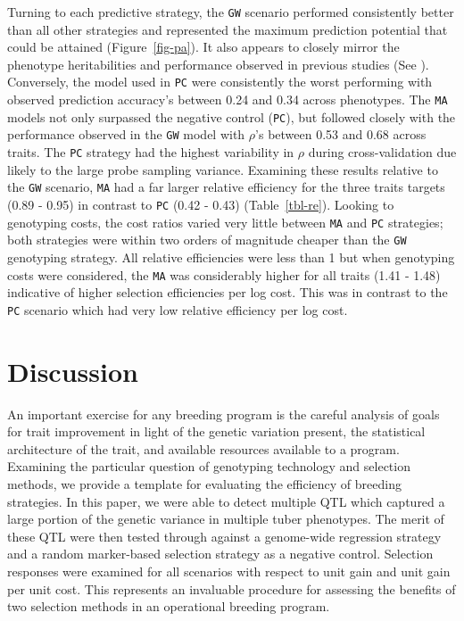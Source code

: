 Turning to each predictive strategy, the \texttt{GW} scenario performed
consistently better than all other strategies and represented the maximum
prediction potential that could be attained (Figure~\ref{fig-pa}). It
also appears to closely mirror the phenotype heritabilities and
performance observed in previous studies (See \textcite{Adams2023}).
Conversely, the model used in \texttt{PC} were consistently the worst
performing with observed prediction accuracy's between 0.24 and 0.34 across
phenotypes. The \texttt{MA} models not only surpassed the negative
control (\texttt{PC}), but followed closely with the performance
observed in the \texttt{GW} model with \(\rho\)'s between 0.53 and 0.68
across traits. The \texttt{PC} strategy had the highest variability in
\(\rho\) during cross-validation due likely to the large probe sampling
variance. Examining these results relative to the \texttt{GW} scenario,
\texttt{MA} had a far larger relative efficiency for the three traits
targets (0.89 - 0.95) in contrast to \texttt{PC} (0.42 - 0.43)
(Table~\ref{tbl-re}). Looking to genotyping costs, the cost ratios varied very little between \texttt{MA} and \texttt{PC} strategies; both strategies were within two orders of magnitude cheaper than the \texttt{GW} genotyping strategy. All relative efficiencies were less than 1 but
when genotyping costs were considered, the \texttt{MA} was considerably
higher for all traits (1.41 - 1.48) indicative of higher selection
efficiencies per log cost. This was in contrast to the \texttt{PC}
scenario which had very low relative efficiency per log cost.
\section{Discussion}

An important exercise for any breeding program is the careful analysis
of goals for trait improvement in light of the genetic variation
present, the statistical architecture of the trait, and available
resources available to a program. Examining the
particular question of genotyping technology and selection methods, we
provide a template for evaluating the efficiency of breeding strategies.
In this paper, we were able to detect multiple QTL which captured a
large portion of the genetic variance in multiple tuber phenotypes. The
merit of these QTL were then tested through against a genome-wide
regression strategy and a random marker-based selection strategy as a
negative control. Selection responses were examined for all scenarios
with respect to unit gain and unit gain per unit cost. This represents
an invaluable procedure for assessing the benefits of two selection
methods in an operational breeding program.

